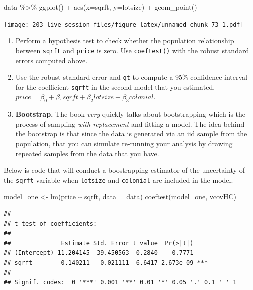 \documentclass[
]{book}
\newenvironment{Shaded}{\begin{snugshade}}{\end{snugshade}}
\newcommand{\AttributeTok}[1]{\textcolor[rgb]{0.77,0.63,0.00}{#1}}
\newcommand{\FunctionTok}[1]{\textcolor[rgb]{0.00,0.00,0.00}{#1}}
\newcommand{\NormalTok}[1]{#1}
\newcommand{\OtherTok}[1]{\textcolor[rgb]{0.56,0.35,0.01}{#1}}
\newcommand{\SpecialCharTok}[1]{\textcolor[rgb]{0.00,0.00,0.00}{#1}}
\theoremstyle{definition}
\theoremstyle{definition}
\theoremstyle{definition}
\theoremstyle{definition}
\theoremstyle{remark}
\begin{document}
\begin{Shaded}
\begin{Highlighting}[]
\NormalTok{data }\SpecialCharTok{\%\textgreater{}\%} 
  \FunctionTok{ggplot}\NormalTok{() }\SpecialCharTok{+} 
  \FunctionTok{aes}\NormalTok{(}\AttributeTok{x=}\NormalTok{sqrft, }\AttributeTok{y=}\NormalTok{lotsize) }\SpecialCharTok{+} 
  \FunctionTok{geom\_point}\NormalTok{()}
\end{Highlighting}
\end{Shaded}

\texttt{[image: 203-live-session\_files/figure-latex/unnamed-chunk-73-1.pdf]}

\begin{enumerate}
\def\labelenumi{\arabic{enumi}.}
\setcounter{enumi}{2}
\item
  Perform a hypothesis test to check whether the population relationship between \texttt{sqrft} and \texttt{price} is zero. Use \texttt{coeftest()} with the robust standard errors computed above.
\item
  Use the robust standard error and \texttt{qt} to compute a 95\% confidence interval for the coefficient \texttt{sqrft} in the second model that you estimated. \(price = \beta_{0} + \beta_{1} sqrft + \beta_{2} lotsize + \beta_{3} colonial\).
\item
  \textbf{Bootstrap.} The book \emph{very} quickly talks about bootstrapping which is the process of sampling \emph{with replacement} and fitting a model. The idea behind the bootstrap is that since the data is generated via an iid sample from the population, that you can simulate re-running your analysis by drawing repeated samples from the data that you have.
\end{enumerate}

Below is code that will conduct a boostrapping estimator of the uncertainty of the \texttt{sqrft} variable when \texttt{lotsize} and \texttt{colonial} are included in the model.

\begin{Shaded}
\begin{Highlighting}[]
\NormalTok{model\_one }\OtherTok{\textless{}{-}} \FunctionTok{lm}\NormalTok{(price }\SpecialCharTok{\textasciitilde{}}\NormalTok{ sqrft, }\AttributeTok{data =}\NormalTok{ data)}
\FunctionTok{coeftest}\NormalTok{(model\_one, vcovHC)}
\end{Highlighting}
\end{Shaded}

\begin{verbatim}
## 
## t test of coefficients:
## 
##              Estimate Std. Error t value  Pr(>|t|)    
## (Intercept) 11.204145  39.450563  0.2840    0.7771    
## sqrft        0.140211   0.021111  6.6417 2.673e-09 ***
## ---
## Signif. codes:  0 '***' 0.001 '**' 0.01 '*' 0.05 '.' 0.1 ' ' 1
\end{verbatim}
\end{document}
